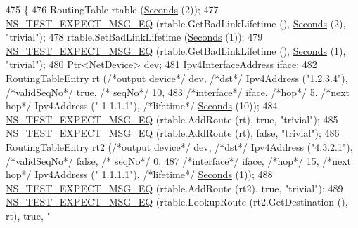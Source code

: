 \begin{DoxyCode}
475   \{
476     RoutingTable rtable (\hyperlink{group__timecivil_ga33c34b816f8ff6628e33d5c8e9713b9e}{Seconds} (2));
477     \hyperlink{group__testing_ga7304ba46a28d8cf08dfdfd6499cf7068}{NS\_TEST\_EXPECT\_MSG\_EQ} (rtable.GetBadLinkLifetime (), 
      \hyperlink{group__timecivil_ga33c34b816f8ff6628e33d5c8e9713b9e}{Seconds} (2), \textcolor{stringliteral}{"trivial"});
478     rtable.SetBadLinkLifetime (\hyperlink{group__timecivil_ga33c34b816f8ff6628e33d5c8e9713b9e}{Seconds} (1));
479     \hyperlink{group__testing_ga7304ba46a28d8cf08dfdfd6499cf7068}{NS\_TEST\_EXPECT\_MSG\_EQ} (rtable.GetBadLinkLifetime (), 
      \hyperlink{group__timecivil_ga33c34b816f8ff6628e33d5c8e9713b9e}{Seconds} (1), \textcolor{stringliteral}{"trivial"});
480     Ptr<NetDevice> dev;
481     Ipv4InterfaceAddress iface;
482     RoutingTableEntry rt (\textcolor{comment}{/*output device*/} dev, \textcolor{comment}{/*dst*/} Ipv4Address (\textcolor{stringliteral}{"1.2.3.4"}), \textcolor{comment}{/*validSeqNo*/} \textcolor{keyword}{true}, \textcolor{comment}{/*
      seqNo*/} 10,
483                                             \textcolor{comment}{/*interface*/} iface, \textcolor{comment}{/*hop*/} 5, \textcolor{comment}{/*next hop*/} Ipv4Address (\textcolor{stringliteral}{"
      1.1.1.1"}), \textcolor{comment}{/*lifetime*/} \hyperlink{group__timecivil_ga33c34b816f8ff6628e33d5c8e9713b9e}{Seconds} (10));
484     \hyperlink{group__testing_ga7304ba46a28d8cf08dfdfd6499cf7068}{NS\_TEST\_EXPECT\_MSG\_EQ} (rtable.AddRoute (rt), \textcolor{keyword}{true}, \textcolor{stringliteral}{"trivial"});
485     \hyperlink{group__testing_ga7304ba46a28d8cf08dfdfd6499cf7068}{NS\_TEST\_EXPECT\_MSG\_EQ} (rtable.AddRoute (rt), \textcolor{keyword}{false}, \textcolor{stringliteral}{"trivial"});
486     RoutingTableEntry rt2 (\textcolor{comment}{/*output device*/} dev, \textcolor{comment}{/*dst*/} Ipv4Address (\textcolor{stringliteral}{"4.3.2.1"}), \textcolor{comment}{/*validSeqNo*/} \textcolor{keyword}{false}, \textcolor{comment}{/*
      seqNo*/} 0,
487                                              \textcolor{comment}{/*interface*/} iface, \textcolor{comment}{/*hop*/} 15, \textcolor{comment}{/*next hop*/} Ipv4Address (\textcolor{stringliteral}{"
      1.1.1.1"}), \textcolor{comment}{/*lifetime*/} \hyperlink{group__timecivil_ga33c34b816f8ff6628e33d5c8e9713b9e}{Seconds} (1));
488     \hyperlink{group__testing_ga7304ba46a28d8cf08dfdfd6499cf7068}{NS\_TEST\_EXPECT\_MSG\_EQ} (rtable.AddRoute (rt2), \textcolor{keyword}{true}, \textcolor{stringliteral}{"trivial"});
489     \hyperlink{group__testing_ga7304ba46a28d8cf08dfdfd6499cf7068}{NS\_TEST\_EXPECT\_MSG\_EQ} (rtable.LookupRoute (rt2.GetDestination (), rt), \textcolor{keyword}{true}, \textcolor{stringliteral}{"
}
\end{DoxyCode}
